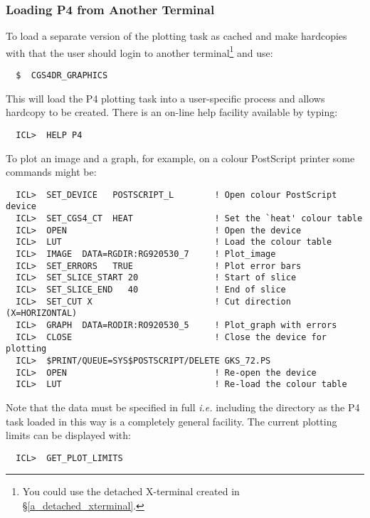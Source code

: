 {\subsubsection{Loading P4 from Another Terminal}

To load a separate version of the plotting task as cached and make hardcopies 
with that the user should login to another terminal\footnote{You could use
the detached X-terminal created in \S \ref{a_detached_xterminal}.} and use:

\begin{verbatim}
  $  CGS4DR_GRAPHICS
\end{verbatim}

This will load the P4 plotting task into a user-specific process and allows
hardcopy to be created. There is an on-line help facility available by typing:

\begin{verbatim}
  ICL>  HELP P4
\end{verbatim}

To plot an image and a graph, for example, on a colour PostScript printer some 
commands might be:

\begin{verbatim}
  ICL>  SET_DEVICE   POSTSCRIPT_L        ! Open colour PostScript device
  ICL>  SET_CGS4_CT  HEAT                ! Set the `heat' colour table
  ICL>  OPEN                             ! Open the device
  ICL>  LUT                              ! Load the colour table
  ICL>  IMAGE  DATA=RGDIR:RG920530_7     ! Plot_image
  ICL>  SET_ERRORS   TRUE                ! Plot error bars
  ICL>  SET_SLICE_START 20               ! Start of slice
  ICL>  SET_SLICE_END   40               ! End of slice
  ICL>  SET_CUT X                        ! Cut direction (X=HORIZONTAL)
  ICL>  GRAPH  DATA=RODIR:RO920530_5     ! Plot_graph with errors
  ICL>  CLOSE                            ! Close the device for plotting
  ICL>  $PRINT/QUEUE=SYS$POSTSCRIPT/DELETE GKS_72.PS
  ICL>  OPEN                             ! Re-open the device
  ICL>  LUT                              ! Re-load the colour table
\end{verbatim}

Note that the data must be specified in full {\em i.e.} including the
directory as the P4 task loaded in this way is a completely general facility.
The current plotting limits can be displayed with:

\begin{verbatim}
  ICL>  GET_PLOT_LIMITS
\end{verbatim}

}
